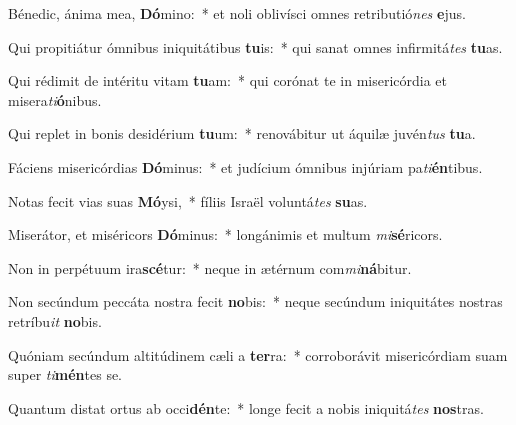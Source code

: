 \item Bénedic, ánima mea, \textbf{Dó}mino:~* et noli oblivísci omnes retributió\textit{nes} \textbf{e}jus.
\item Qui propitiátur ómnibus iniquitátibus \textbf{tu}is:~* qui sanat omnes infirmitá\textit{tes} \textbf{tu}as.
\item Qui rédimit de intéritu vitam \textbf{tu}am:~* qui corónat te in misericórdia et misera\textit{ti}\textbf{ó}nibus.
\item Qui replet in bonis desidérium \textbf{tu}um:~* renovábitur ut áquilæ juvén\textit{tus} \textbf{tu}a.
\item Fáciens misericórdias \textbf{Dó}minus:~* et judícium ómnibus injúriam pa\textit{ti}\textbf{én}tibus.
\item Notas fecit vias suas \textbf{Mó}ysi,~* fíliis Israël voluntá\textit{tes} \textbf{su}as.
\item Miserátor, et miséricors \textbf{Dó}minus:~* longánimis et multum \textit{mi}\textbf{sé}ricors.
\item Non in perpétuum ira\textbf{scé}tur:~* neque in ætérnum com\textit{mi}\textbf{ná}bitur.
\item Non secúndum peccáta nostra fecit \textbf{no}bis:~* neque secúndum iniquitátes nostras retríbu\textit{it} \textbf{no}bis.
\item Quóniam secúndum altitúdinem cæli a \textbf{ter}ra:~* corroborávit misericórdiam suam super \textit{ti}\textbf{mén}tes se.
\item Quantum distat ortus ab occi\textbf{dén}te:~* longe fecit a nobis iniquitá\textit{tes} \textbf{nos}tras.
